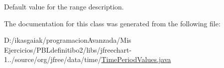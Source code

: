 Default value for the range description. 

The documentation for this class was generated from the following file\+:\begin{DoxyCompactItemize}
\item 
D\+:/ikasgaiak/programacion\+Avanzada/\+Mis Ejercicios/\+P\+B\+Ldefinitibo2/libs/jfreechart-\/1../source/org/jfree/data/time/\mbox{\hyperlink{_time_period_values_8java}{Time\+Period\+Values.\+java}}\end{DoxyCompactItemize}
